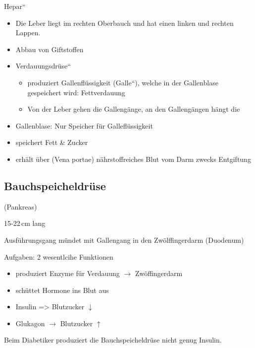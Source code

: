 
{\quotedblbase}Hepar{\textquotedblleft}

\gMarried
{\begin{itemize}
    \item Die Leber liegt im rechten Oberbauch und hat einen linken und
    rechten Lappen.
    \item Abbau von Giftstoffen
    \item {\quotedblbase}Verdauungsdr\"use{\textquotedblleft}
    \begin{itemize}
        \item produziert Gallenfl\"ussigkeit
        ({\quotedblbase}Galle{\textquotedblleft}), welche in der Gallenblase
        gespeichert wird: Fettverdauung
        \item Von der Leber gehen die Galleng\"ange, an den Galleng\"angen
        h\"angt die
    \end{itemize}
    \item {}Gallenblase: Nur Speicher f\"ur
    Gallefl\"ussigkeit
    \item speichert Fett \& Zucker
    \item erh\"alt \"uber 
    (Vena portae) n\"ahrstoffreiches Blut vom Darm zwecks Entgiftung
\end{itemize}}
{}



 

\subsection{Bauchspeicheldr\"use}
(Pankreas)

15-22\,cm lang

Ausf\"uhrungsgang m\"undet mit Gallengang in den Zw\"olffingerdarm
(Duodenum)

Aufgaben: 2 wesentlcihe Funktionen

\begin{itemize}
\item produziert Enzyme f\"ur Verdauung ${\rightarrow}$ Zw\"offingerdarm
\item sch\"uttet Hormone ins Blut aus
\item {}Insulin ={\textgreater} Blutzucker ${\downarrow}$
\item Glukagon ${\rightarrow}$ Blutzucker ${\uparrow}$
\end{itemize}
Beim Diabetiker produziert die Bauchspeicheldr\"use nicht genug Insulin.


